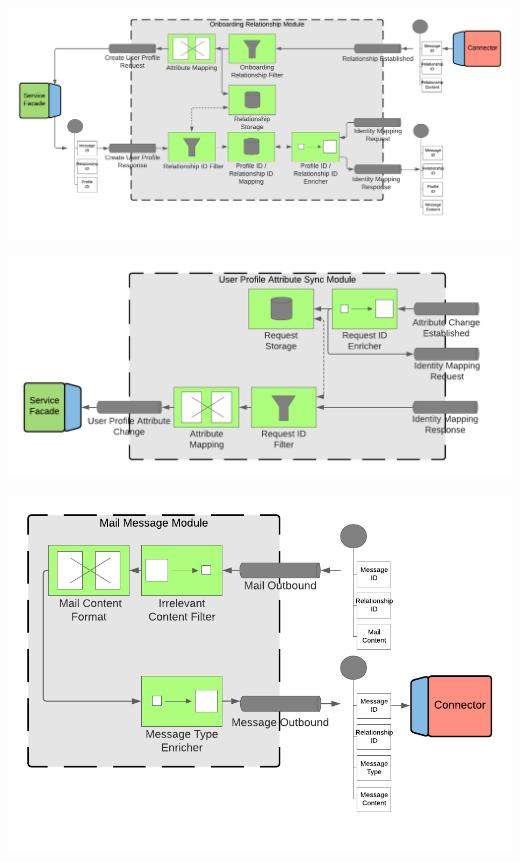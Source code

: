 \begin{center}
    \includegraphics[scale=0.6]{Diagrams/Integration Architecture 1/Technological Integration/10. Onboarding Relationship Module.pdf}
\end{center}

\begin{center}
    \includegraphics[scale=0.6]{Diagrams/Integration Architecture 1/Technological Integration/11. User Profile Attribute Sync Module.pdf}
\end{center}

\begin{center}
    \includegraphics[scale=0.6]{Diagrams/Integration Architecture 1/Technological Integration/12. Mail Message Module.pdf}
\end{center}

